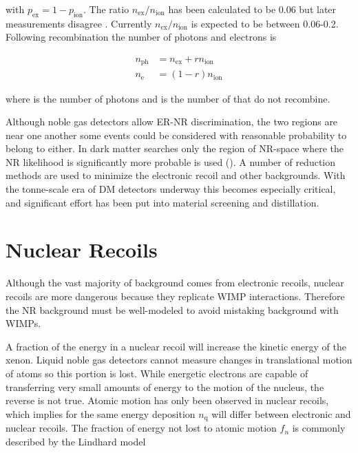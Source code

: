 \noindent with $p_{\mathrm{ex}} = 1 - p_{\mathrm{ion}}$.  The ratio $n_{\mathrm{ex}} / n_{\mathrm{ion}}$ has been calculated to be
0.06 
but later measurements disagree .  Currently $n_{\mathrm{ex}} / n_{\mathrm{ion}}$ is expected to be
between 0.06-0.2.  Following recombination the number of photons and electrons is

\begin{subequations}
\begin{align}
n_{\mathrm{ph}} &= n_{\mathrm{ex}} + rn_{\mathrm{ion}} \\
n_{\mathrm{e}} &= (1 - r)n_{\mathrm{ion}}
\end{align}
\end{subequations}

\noindent where \nphot is the number of photons and \nelect is the number of \electron that do not recombine.

Although noble gas detectors allow ER-NR discrimination, the two regions are near one another some events could
be considered with reasonable probability to belong to either.  In dark matter searches only the region of NR-space where the NR
likelihood is significantly more probable is used ().  A number of reduction methods are used to minimize
the electronic recoil and other backgrounds.  With the tonne-scale era of DM detectors
underway this becomes especially critical, and significant effort has been put into material screening and distillation.


\section{Nuclear Recoils}
\label{sec:nr}
Although the vast majority of background comes from electronic recoils, nuclear recoils are more dangerous because they replicate
WIMP interactions.  Therefore the NR background must be well-modeled to avoid mistaking background with WIMPs.

A fraction of the energy in a nuclear recoil will increase the kinetic energy of the xenon.  Liquid noble gas detectors cannot measure
changes in translational motion of atoms so this portion is lost.  While energetic electrons are capable of transferring very small
amounts of energy to the motion of the nucleus, the reverse is not true.  Atomic motion has only been observed in nuclear recoils,
which implies for the same energy deposition $n_{\mathrm{q}}$ will differ between electronic and nuclear recoils.  The fraction of energy
not lost to atomic motion $f_{n}$ is commonly described by the Lindhard model

